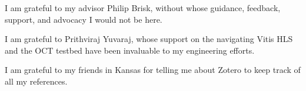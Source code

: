 I am grateful to my advisor Philip Brisk, without whose guidance, feedback,
support, and advocacy I would not be here.

I am grateful to Prithviraj Yuvaraj, whose support on the navigating Vitis HLS
and the OCT testbed have been invaluable to my engineering efforts.

I am grateful to my friends in Kansas for telling me about Zotero to keep track
of all my references.
